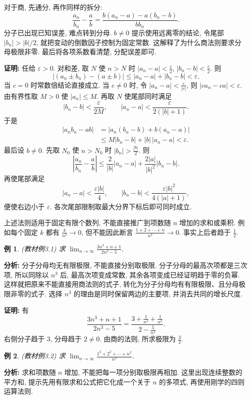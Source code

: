 \documentclass[UTF8,openany]{ctexbook}
\theoremstyle{chinesetextbook}
\newtheorem{example}{例}[section]
\newenvironment{cnproof}{\par\indent\textbf{证明:} \ignorespaces}{\par}
\begin{document}
对于商, 先通分, 再作同样的拆分:
\[
\frac{a_n}{b_n}-\frac ab
=\frac{b(a_n-a)-a(b_n-b)}{bb_n}.
\]
分子已出现已知误差, 难点转到分母. $b\ne0$ 提示使用远离零的结论, 令尾部 $|b_n|>|b|/2$, 就把变动的倒数因子控制为固定常数. 这解释了为什么商法则要求分母极限非零. 最后将各项系数看清楚, 分配误差即可.
\begin{cnproof}
任给 $\varepsilon>0$. 对和差, 取 $N$ 使 $n>N$ 时 $\displaystyle |a_n-a|<\frac\varepsilon2$, $\displaystyle |b_n-b|<\frac\varepsilon2$. 则
\[
|(a_n\pm b_n)-(a\pm b)|\le|a_n-a|+|b_n-b|<\varepsilon.
\]
当 $c=0$ 时常数倍结论直接成立. 当 $c\ne0$ 时, 令 $\displaystyle |a_n-a|<\frac\varepsilon{|c|}$, 则 $|ca_n-ca|<\varepsilon$.
由有界性取 $M>0$ 使 $|a_n|\le M$. 再取 $N$ 使尾部同时满足
\[
|b_n-b|<\frac{\varepsilon}{2M},\qquad
|a_n-a|<\frac{\varepsilon}{2(|b|+1)}.
\]
于是
\[
\begin{aligned}
|a_nb_n-ab|
&=|a_n(b_n-b)+b(a_n-a)|\\
&\le M|b_n-b|+|b|\,|a_n-a|<\varepsilon.
\end{aligned}
\]
最后设 $b\ne0$. 先取 $N_0$ 使 $n>N_0$ 时 $\displaystyle |b_n|>\frac{|b|}{2}$. 则
\[
\left|\frac{a_n}{b_n}-\frac ab\right|
\le\frac2{|b|}|a_n-a|+\frac{2|a|}{|b|^2}|b_n-b|.
\]
再使尾部满足
\[
|a_n-a|<\frac{\varepsilon|b|}{4},\qquad
|b_n-b|<\frac{\varepsilon|b|^2}{4(|a|+1)},
\]
便使右边小于 $\varepsilon$. 各次尾部限制取最大分界下标后即可同时成立.
\end{cnproof}
上述法则适用于固定有限个数列, 不能直接推广到项数随 $n$ 增加的求和或乘积. 例如每个固定 $k$ 都有 $\displaystyle \frac{k}{n^2}\to0$, 但不能因此断言 $\displaystyle \frac{1+2+\cdots+n}{n^2}\to0$. 事实上后者趋于 $\displaystyle \frac12$.
\begin{example}
(教材例3.1) 求 $\displaystyle \lim_{n\to\infty}\frac{3n^3+n+1}{2n^3-5}$.
\end{example}
\par\indent\textbf{分析:} 分子分母均无有限极限, 不能直接分别取极限. 分子分母的最高次项都是三次项, 所以同除以 $n^3$ 后, 最高次项变成常数, 其余各项变成已经证明趋于零的负幂. 这样就把原来不能直接用商法则的式子, 转化为分子分母均有有限极限、且分母极限非零的式子. 选择 $n^3$ 的理由是同时保留两边的主要项, 并消去共同的增长尺度.
\begin{cnproof}
有
\[
\frac{3n^3+n+1}{2n^3-5}
=\frac{3+\frac1{n^2}+\frac1{n^3}}{2-\frac5{n^3}}.
\]
右侧分子趋于 $3$, 分母趋于 $2\ne0$. 由商的法则, 所求极限为 $\displaystyle \frac32$.
\end{cnproof}
\begin{example}
(教材例3.2) 求 $\displaystyle \lim_{n\to\infty}\frac{1^2+2^2+\cdots+n^2}{n^3}$.
\end{example}
\par\indent\textbf{分析:} 求和项数随 $n$ 增加, 不能把每一项分别取极限再相加. 这里出现连续整数的平方和, 提示先用有限求和公式把它化成一个关于 $n$ 的多项式, 再使用刚学的四则运算法则.
\end{document}
